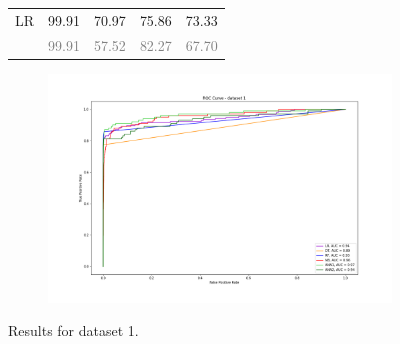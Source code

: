 \documentclass{Configuration_Files/PoliMi3i_thesis}
\begin{document}
\begin{figure}[H]
\begin{table}[H]
\begin{tabular}{ c  c  c  c  c }
    LR	& 99.91	& 70.97	& 75.86 & 73.33 \\
        & \footnotesize\textcolor{gray}{99.91} & \footnotesize\textcolor{gray}{57.52} & \footnotesize\textcolor{gray}{82.27} & \footnotesize\textcolor{gray}{67.70} \\
    \hline
    \end{tabular}
\end{table}
\begin{subfigure}
    \centering
    \includegraphics[scale=0.3]{Images/ROC_1.png}
\end{subfigure}
  \caption{Results for dataset 1.}
\end{figure}
\end{document}
